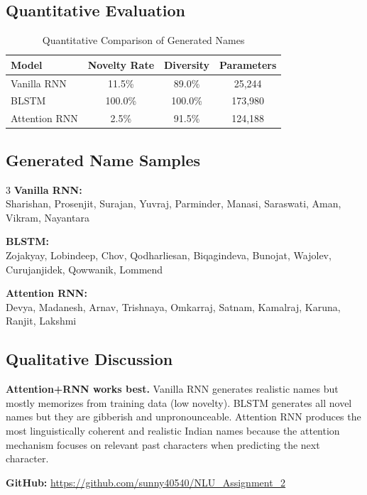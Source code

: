 \documentclass[11pt,a4paper]{article}
\begin{document}
\subsection{Quantitative Evaluation}

\begin{table}[H]
\centering
\caption{Quantitative Comparison of Generated Names}
\begin{tabular}{lccc}
\toprule
\textbf{Model} & \textbf{Novelty Rate} & \textbf{Diversity} & \textbf{Parameters} \\
\midrule
Vanilla RNN    & 11.5\% & 89.0\% & 25,244 \\
BLSTM          & 100.0\% & 100.0\% & 173,980 \\
Attention RNN  & 2.5\% & 91.5\% & 124,188 \\
\bottomrule
\end{tabular}
\end{table}

\subsection{Generated Name Samples}

\begin{multicols}{3}
\textbf{Vanilla RNN:}\\
Sharishan, Prosenjit, Surajan, Yuvraj, Parminder, Manasi, Saraswati, Aman, Vikram, Nayantara

\columnbreak
\textbf{BLSTM:}\\
Zojakyay, Lobindeep, Chov, Qodharliesan, Biqagindeva, Bunojat, Wajolev, Curujanjidek, Qowwanik, Lommend

\columnbreak
\textbf{Attention RNN:}\\
Devya, Madanesh, Arnav, Trishnaya, Omkarraj, Satnam, Kamalraj, Karuna, Ranjit, Lakshmi
\end{multicols}

\subsection{Qualitative Discussion}

\textbf{Attention+RNN works best.} Vanilla RNN generates realistic names but mostly memorizes from training data (low novelty). BLSTM generates all novel names but they are gibberish and unpronounceable. Attention RNN produces the most linguistically coherent and realistic Indian names because the attention mechanism focuses on relevant past characters when predicting the next character.

\vspace{0.5em}
\noindent\textbf{GitHub:} \url{https://github.com/sunny40540/NLU_Assignment_2}
\end{document}
